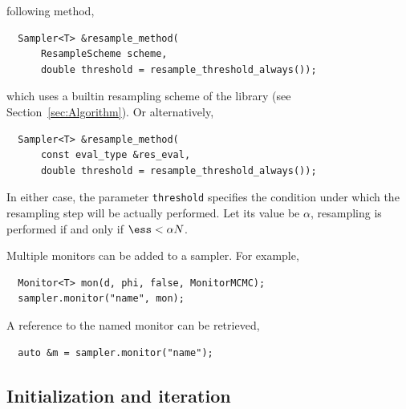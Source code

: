 following method,
\begin{Verbatim}
  Sampler<T> &resample_method(
      ResampleScheme scheme,
      double threshold = resample_threshold_always());
\end{Verbatim}
which uses a builtin resampling scheme of the library (see
Section~\ref{sec:Algorithm}). Or alternatively,
\begin{Verbatim}
  Sampler<T> &resample_method(
      const eval_type &res_eval,
      double threshold = resample_threshold_always());
\end{Verbatim}
In either case, the parameter \verb|threshold| specifies the condition under
which the resampling step will be actually performed. Let its value be
$\alpha$, resampling is performed if and only if $\ess < \alpha N$.

Multiple monitors can be added to a sampler. For example,
\begin{Verbatim}
  Monitor<T> mon(d, phi, false, MonitorMCMC);
  sampler.monitor("name", mon);
\end{Verbatim}
A reference to the named monitor can be retrieved,
\begin{Verbatim}
  auto &m = sampler.monitor("name");
\end{Verbatim}

\subsection{Initialization and iteration}
\label{sub:Initialization and iteration}

